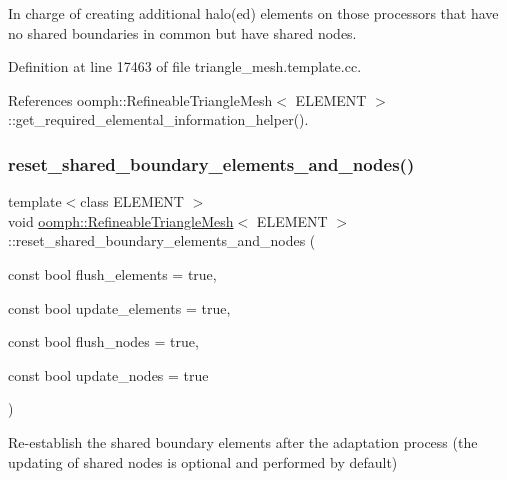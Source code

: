In charge of creating additional halo(ed) elements on those processors that have no shared boundaries in common but have shared nodes. 



Definition at line 17463 of file triangle\+\_\+mesh.\+template.\+cc.



References oomph\+::\+Refineable\+Triangle\+Mesh$<$ E\+L\+E\+M\+E\+N\+T $>$\+::get\+\_\+required\+\_\+elemental\+\_\+information\+\_\+helper().

\mbox{\label{classoomph_1_1RefineableTriangleMesh_a43f080841444e0d085669db4ae580f2f}} 
\subsubsection{\texorpdfstring{reset\+\_\+shared\+\_\+boundary\+\_\+elements\+\_\+and\+\_\+nodes()}{reset\_shared\_boundary\_elements\_and\_nodes()}}
{\footnotesize\ttfamily template$<$class E\+L\+E\+M\+E\+NT $>$ \\
void \hyperlink{classoomph_1_1RefineableTriangleMesh}{oomph\+::\+Refineable\+Triangle\+Mesh}$<$ E\+L\+E\+M\+E\+NT $>$\+::reset\+\_\+shared\+\_\+boundary\+\_\+elements\+\_\+and\+\_\+nodes (\begin{DoxyParamCaption}\item[{const bool}]{flush\+\_\+elements = {\ttfamily true},  }\item[{const bool}]{update\+\_\+elements = {\ttfamily true},  }\item[{const bool}]{flush\+\_\+nodes = {\ttfamily true},  }\item[{const bool}]{update\+\_\+nodes = {\ttfamily true} }\end{DoxyParamCaption})\hspace{0.3cm}{\ttfamily [protected]}}



Re-\/establish the shared boundary elements after the adaptation process (the updating of shared nodes is optional and performed by default) 



